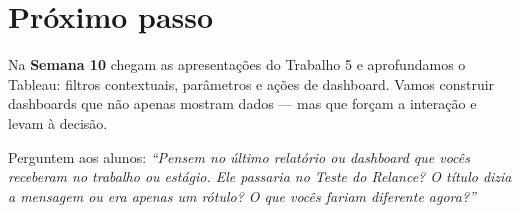 \section{Próximo passo}

Na \textbf{Semana 10} chegam as apresentações do Trabalho 5 e aprofundamos
o Tableau: filtros contextuais, parâmetros e ações de dashboard. Vamos
construir dashboards que não apenas mostram dados — mas que forçam a
interação e levam à decisão.

Perguntem aos alunos: \textit{``Pensem no último relatório ou dashboard que
vocês receberam no trabalho ou estágio. Ele passaria no Teste do Relance?
O título dizia a mensagem ou era apenas um rótulo? O que vocês fariam
diferente agora?''}
